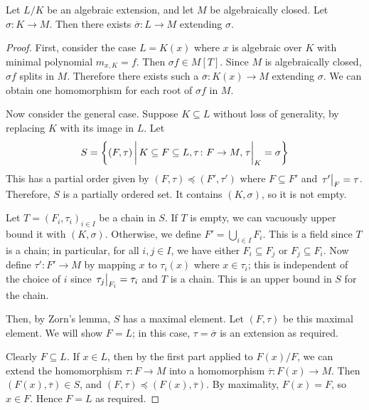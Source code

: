 \begin{proposition}
	Let \( L / K \) be an algebraic extension, and let \( M \) be algebraically closed.
	Let \( \sigma \colon K \to M \).
	Then there exists \( \overline \sigma \colon L \to M \) extending \( \sigma \).
\end{proposition}
\begin{proof}
	First, consider the case \( L = K(x) \) where \( x \) is algebraic over \( K \) with minimal polynomial \( m_{x,K} = f \).
	Then \( \sigma f \in M[T] \).
	Since \( M \) is algebraically closed, \( \sigma f \) splits in \( M \).
	Therefore there exists such a \( \overline \sigma \colon K(x) \to M \) extending \( \sigma \).
	We can obtain one homomorphism for each root of \( \sigma f \) in \( M \).

	Now consider the general case.
	Suppose \( K \subseteq L \) without loss of generality, by replacing \( K \) with its image in \( L \).
	Let
	\[ S = \qty{(F,\tau) \midd K \subseteq F \subseteq L, \tau \colon F \to M, \eval{\tau}_K = \sigma} \]
	This has a partial order given by \( (F,\tau) \preceq (F',\tau') \) where \( F \subseteq F' \) and \( \eval{\tau'}_F = \tau \).
	Therefore, \( S \) is a partially ordered set.
	It contains \( (K, \sigma) \), so it is not empty.

	Let \( T = (F_i, \tau_i)_{i \in I} \) be a chain in \( S \).
	If \( T \) is empty, we can vacuously upper bound it with \( (K, \sigma) \).
	Otherwise, we define \( F' = \bigcup_{i \in I} F_i \).
	This is a field since \( T \) is a chain; in particular, for all \( i, j \in I \), we have either \( F_i \subseteq F_j \) or \( F_j \subseteq F_i \).
	Now define \( \tau' \colon F' \to M \) by mapping \( x \) to \( \tau_i(x) \) where \( x \in \tau_i \); this is independent of the choice of \( i \) since \( \eval{\tau_j}_{F_i} = \tau_i \) and \( T \) is a chain.
	This is an upper bound in \( S \) for the chain.

	Then, by Zorn's lemma, \( S \) has a maximal element.
	Let \( (F, \tau) \) be this maximal element.
	We will show \( F = L \); in this case, \( \tau = \overline \sigma \) is an extension as required.

	Clearly \( F \subseteq L \).
	If \( x \in L \), then by the first part applied to \( F(x) / F \), we can extend the homomorphism \( \tau \colon F \to M \) into a homomorphism \( \overline \tau \colon F(x) \to M \).
	Then \( (F(x), \overline \tau) \in S \), and \( (F,\tau) \preceq (F(x), \overline \tau) \).
	By maximality, \( F(x) = F \), so \( x \in F \).
	Hence \( F = L \) as required.
\end{proof}

